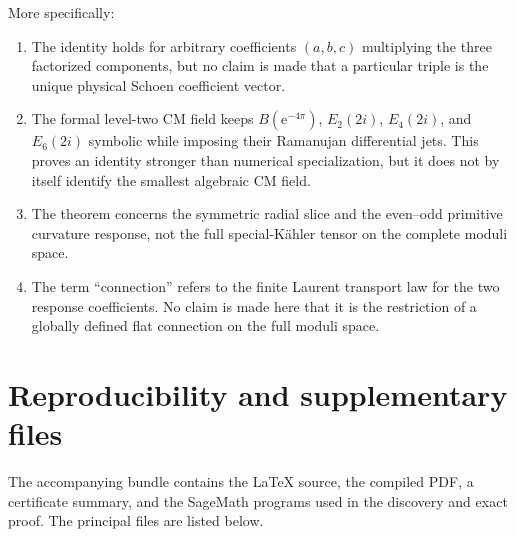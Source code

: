 \documentclass[11pt]{article}
\theoremstyle{definition}
\theoremstyle{remark}
\newcommand{\e}{\mathrm{e}}
\begin{document}
More specifically:

\begin{enumerate}[label=\arabic*.]
 \item The identity holds for arbitrary coefficients $(a,b,c)$ multiplying the three factorized components, but no claim is made that a particular triple is the unique physical Schoen coefficient vector.
 \item The formal level-two CM field keeps $B(\e^{-4\pi})$, $E_2(2i)$, $E_4(2i)$, and $E_6(2i)$ symbolic while imposing their Ramanujan differential jets.  This proves an identity stronger than numerical specialization, but it does not by itself identify the smallest algebraic CM field.
 \item The theorem concerns the symmetric radial slice and the even--odd primitive curvature response, not the full special-K\"ahler tensor on the complete moduli space.
 \item The term ``connection'' refers to the finite Laurent transport law for the two response coefficients.  No claim is made here that it is the restriction of a globally defined flat connection on the full moduli space.
\end{enumerate}

\section{Reproducibility and supplementary files}

The accompanying bundle contains the LaTeX source, the compiled PDF, a certificate summary, and the SageMath programs used in the discovery and exact proof.  The principal files are listed below.
\end{document}
